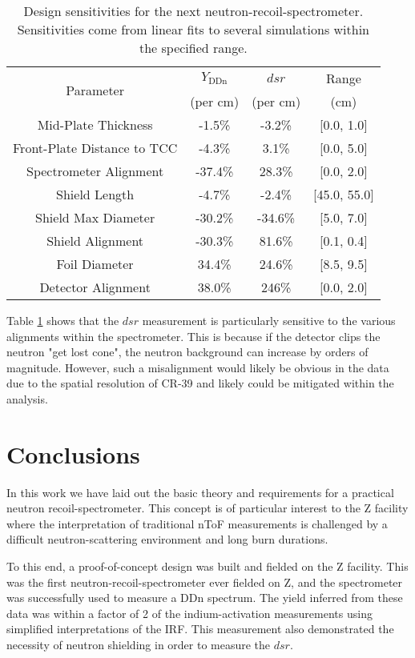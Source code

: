 \begin{table}[!h]
	\caption{ Design sensitivities for the next neutron-recoil-spectrometer. Sensitivities come from linear fits to several simulations within the specified range.  }
	\label{tab_designSensitivities}
	\renewcommand{\arraystretch}{1.2} 
	\begin{tabular}{  c | c | c | c }
		\multirow{2}{*}{Parameter} & $Y_{\mathrm{DDn}}$ & $dsr$ & Range \\
		&(per cm)&(per cm)&(cm)\\\hline
		Mid-Plate Thickness & -1.5\%  & -3.2\% & [0.0, 1.0]\\
		Front-Plate Distance to TCC & -4.3\%  & 3.1\% &[0.0, 5.0] \\
		Spectrometer Alignment & -37.4\%  & 28.3\% & [0.0, 2.0]  \\
		Shield Length & -4.7\%  & -2.4\% & [45.0, 55.0] \\
		Shield Max Diameter & -30.2\%  & -34.6\% & [5.0, 7.0] \\
		Shield Alignment & -30.3\% & 81.6\% & [0.1, 0.4] \\
		Foil Diameter & 34.4\%  & 24.6\% & [8.5, 9.5] \\
		Detector Alignment & 38.0\%  & 246\% & [0.0, 2.0]\\
	\end{tabular}		
\end{table}

Table \ref{tab_designSensitivities} shows that the $dsr$ measurement is particularly sensitive to the various alignments within the spectrometer. This is because if the detector clips the neutron "get lost cone", the neutron background can increase by orders of magnitude. However, such a misalignment would likely be obvious in the data due to the spatial resolution of CR-39 and likely could be mitigated within the analysis. 

\section{Conclusions}

In this work we have laid out the basic theory and requirements for a practical neutron recoil-spectrometer. This concept is of particular interest to the Z facility where the interpretation of traditional nToF measurements is challenged by a difficult neutron-scattering environment and long burn durations. 

To this end, a proof-of-concept design was built and fielded on the Z facility. This was the first neutron-recoil-spectrometer ever fielded on Z, and the spectrometer was successfully used to measure a DDn spectrum. The yield inferred from these data was within a factor of 2 of the indium-activation measurements using simplified interpretations of the IRF. This measurement also demonstrated the necessity of neutron shielding in order to measure the $dsr$. 

